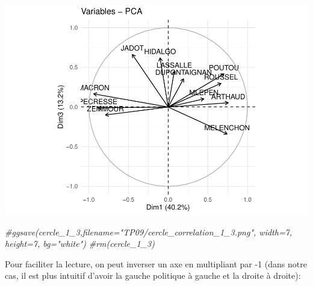 \documentclass[
]{book}
\newenvironment{Shaded}{\begin{snugshade}}{\end{snugshade}}
\newcommand{\AttributeTok}[1]{\textcolor[rgb]{0.13,0.29,0.53}{#1}}
\newcommand{\CommentTok}[1]{\textcolor[rgb]{0.56,0.35,0.01}{\textit{#1}}}
\newcommand{\DecValTok}[1]{\textcolor[rgb]{0.00,0.00,0.81}{#1}}
\newcommand{\FunctionTok}[1]{\textcolor[rgb]{0.13,0.29,0.53}{\textbf{#1}}}
\newcommand{\NormalTok}[1]{#1}
\newcommand{\OtherTok}[1]{\textcolor[rgb]{0.56,0.35,0.01}{#1}}
\newcommand{\SpecialCharTok}[1]{\textcolor[rgb]{0.81,0.36,0.00}{\textbf{#1}}}
\begin{document}
\includegraphics{bookdown-demo_files/figure-latex/unnamed-chunk-63-1.pdf}

\begin{Shaded}
\begin{Highlighting}[]
\CommentTok{\#ggsave(cercle\_1\_3,filename="TP09/cercle\_correlation\_1\_3.png", width=7, height=7, bg="white")}
\CommentTok{\#rm(cercle\_1\_3)}
\end{Highlighting}
\end{Shaded}

Pour faciliter la lecture, on peut inverser un axe en multipliant par -1 (dans notre cas, il est plus intuitif d'avoir la gauche politique à gauche et la droite à droite):

\begin{Shaded}
\end{Shaded}
\end{document}
